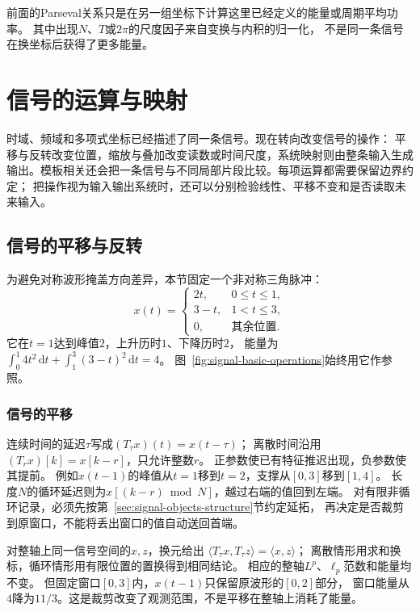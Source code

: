 前面的Parseval关系只是在另一组坐标下计算这里已经定义的能量或周期平均功率。
其中出现$N$、$T$或$2\pi$的尺度因子来自变换与内积的归一化，
不是同一条信号在换坐标后获得了更多能量。

\section{信号的运算与映射}
\label{sec:signal-operations-maps}

时域、频域和多项式坐标已经描述了同一条信号。现在转向改变信号的操作：
平移与反转改变位置，缩放与叠加改变读数或时间尺度，系统映射则由整条输入生成
输出。模板相关还会把一条信号与不同局部片段比较。每项运算都需要保留边界约定；
把操作视为输入输出系统时，还可以分别检验线性、平移不变和是否读取未来输入。

\subsection{信号的平移与反转}

为避免对称波形掩盖方向差异，本节固定一个非对称三角脉冲：
\begin{equation}
  x(t)=
  \begin{cases}
    2t,&0\leq t\leq1,\\
    3-t,&1<t\leq3,\\
    0,&\text{其余位置}.
  \end{cases}
  \label{eq:signal-asymmetric-wave}
\end{equation}
它在$t=1$达到峰值$2$，上升历时$1$、下降历时$2$，
能量为$\int_0^1 4t^2\,\mathrm dt+\int_1^3(3-t)^2\,\mathrm dt=4$。
图~\ref{fig:signal-basic-operations}始终用它作参照。

\subsubsection{信号的平移}

连续时间的延迟$\tau$写成$(T_\tau x)(t)=x(t-\tau)$；
离散时间沿用$(T_rx)[k]=x[k-r]$，只允许整数$r$。
正参数使已有特征推迟出现，负参数使其提前。
例如$x(t-1)$的峰值从$t=1$移到$t=2$，支撑从$[0,3]$移到$[1,4]$。
长度$N$的循环延迟则为$x[(k-r)\bmod N]$，越过右端的值回到左端。
对有限非循环记录，必须先按第~\ref{sec:signal-objects-structure}节约定延拓，
再决定是否裁剪到原窗口，不能将丢出窗口的值自动送回首端。

对整轴上同一信号空间的$x,z$，换元给出
$\langle T_\tau x,T_\tau z\rangle=\langle x,z\rangle$；
离散情形用求和换标，循环情形用有限位置的置换得到相同结论。
相应的整轴$L^p$、$\ell_p$范数和能量均不变。
但固定窗口$[0,3]$内，$x(t-1)$只保留原波形的$[0,2]$部分，
窗口能量从$4$降为$11/3$。这是裁剪改变了观测范围，不是平移在整轴上消耗了能量。

